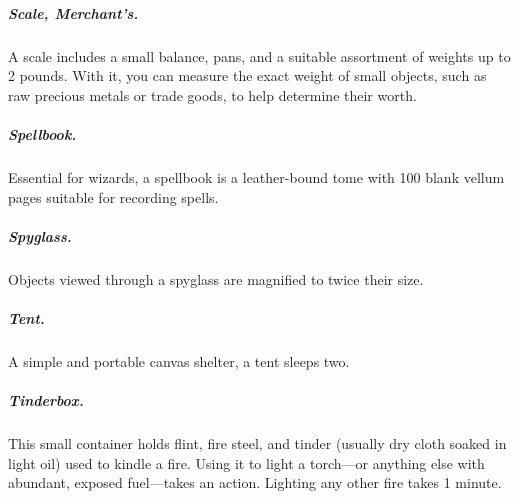 \subparagraph*{Scale, Merchant's.} A scale includes a small balance, pans, and a suitable assortment of weights up to 2 pounds. With it, you can measure the exact weight of small objects, such as raw precious metals or trade goods, to help determine their worth.

\subparagraph*{Spellbook.} Essential for wizards, a spellbook is a leather-bound tome with 100 blank vellum pages suitable for recording spells.

\subparagraph*{Spyglass.} Objects viewed through a spyglass are magnified to twice their size.

\subparagraph*{Tent.} A simple and portable canvas shelter, a tent sleeps two.

\subparagraph*{Tinderbox.} This small container holds flint, fire steel, and tinder (usually dry cloth soaked in light oil) used to kindle a fire. Using it to light a torch—or anything else with abundant, exposed fuel—takes an action. Lighting any other fire takes 1 minute.

